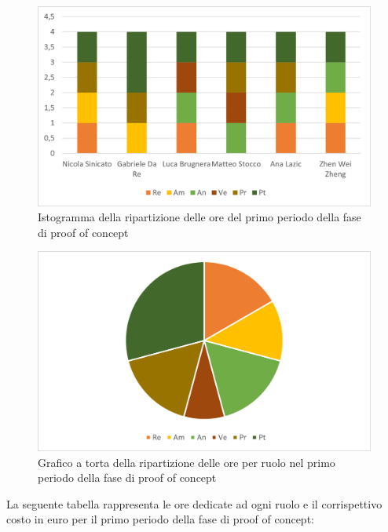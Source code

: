 \begin{figure}[H]
    \centering
    \includegraphics[scale=0.6]{img/grafi preventivo/istogrammi/proof/periodo1.png}
    \caption{Istogramma della ripartizione delle ore del primo periodo della fase di proof of concept}
\end{figure}
\begin{figure}[H]
    \centering
    \includegraphics[scale=0.6]{img/grafi preventivo/torta/proof/periodo1.png}
    \caption{Grafico a torta della ripartizione delle ore per ruolo nel primo periodo della fase di proof of concept}
\end{figure}
La seguente tabella rappresenta le ore dedicate ad ogni ruolo e il corrispettivo costo in euro per il primo periodo della fase di proof of concept:

